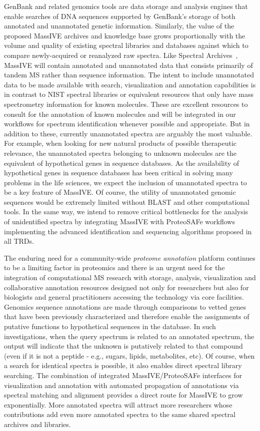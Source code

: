 \documentclass[arial,11pt]{article}
\begin{document}
GenBank and related genomics tools are data storage and analysis engines that enable searches of DNA sequences
supported by GenBank's storage of both annotated and unannotated genetic information. Similarly, the value of the proposed MassIVE archives and knowledge base grows proportionally with the volume and quality of existing spectral libraries and databases against which to compare newly-acquired or reanalyzed raw spectra. Like Spectral Archives~\cite{frank11}, MassIVE will contain annotated and unannotated data that consists primarily of tandem MS rather than sequence information. The intent to include unannotated data to be made available with search, visualization and annotation capabilities is in contrast to NIST spectral libraries or equivalent resources that only have mass spectrometry information for known molecules. These are excellent resources to consult for the annotation of known molecules and will be integrated in our workflows for spectrum identification whenever possible and appropriate. But in addition to these, currently unannotated spectra are arguably the most valuable. For example, when looking for new natural products of possible therapeutic relevance, the unannotated spectra belonging to unknown molecules are the equivalent of hypothetical genes in sequence databases. As the availability of hypothetical genes in sequence databases has been critical in solving many problems in the life sciences, we expect the inclusion of unannotated spectra to be a key feature of MassIVE. Of course, the utility of unannotated genomic sequences would be extremely limited without BLAST and other computational tools. In the same way, we intend to remove critical bottlenecks for the analysis of unidentified spectra by integrating MassIVE with ProteoSAFe workflows implementing the advanced identification and sequencing algorithms proposed in all TRDs.

The enduring need for a community-wide {\em proteome annotation} platform continues to be a limiting factor in proteomics and there is an urgent need for the integration of computational MS research with storage, analysis, visualization and collaborative annotation resources designed not only for researchers but also for biologists and general practitioners accessing the technology via core facilities. Genomics sequence annotations are made through comparisons to vetted genes that have been previously characterized and therefore enable the assignments of putative functions to hypothetical sequences in the database. In such investigations, when the query spectrum is related to an annotated spectrum, the output will indicate that the unknown is putatively related to that compound (even if it is not a peptide - e.g., sugars, lipids, metabolites, etc). Of course, when a search for identical spectra is possible, it also enables direct spectral library searching. The combination of integrated MassIVE/ProteoSAFe interfaces for visualization and annotation with automated propagation of annotations via spectral matching and alignment provides a direct route for MassIVE to grow exponentially. More annotated spectra will attract more researchers whose contributions add even more annotated spectra to the same shared spectral archives and libraries.
\end{document}
